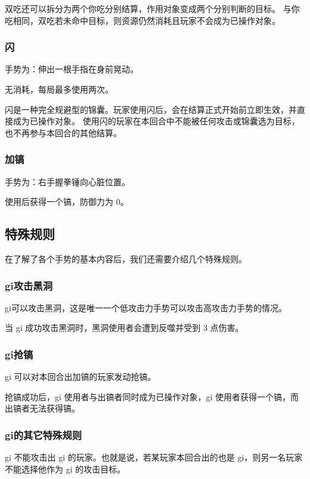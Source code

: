 \documentclass[12pt]{ctexart}
\begin{document}
双吃还可以拆分为两个你吃分别结算，作用对象变成两个分别判断的目标。
与你吃相同，双吃若未命中目标，则资源仍然消耗且玩家不会成为已操作对象。

\subsubsection{闪}

手势为：伸出一根手指在身前晃动。

无消耗，每局最多使用两次。

闪是一种完全规避型的锦囊。玩家使用闪后，会在结算正式开始前立即生效，并直接成为已操作对象。
使用闪的玩家在本回合中不能被任何攻击或锦囊选为目标，也不再参与本回合的其他结算。

\subsubsection{加镐}

手势为：右手握拳锤向心脏位置。

使用后获得一个镐，防御力为 0。

\subsection{特殊规则}

在了解了各个手势的基本内容后，我们还需要介绍几个特殊规则。

\subsubsection{gi攻击黑洞}

gi可以攻击黑洞，这是唯一一个低攻击力手势可以攻击高攻击力手势的情况。

当 gi 成功攻击黑洞时，黑洞使用者会遭到反噬并受到 3 点伤害。

\subsubsection{gi抢镐}

gi 可以对本回合出加镐的玩家发动抢镐。

抢镐成功后，gi 使用者与出镐者同时成为已操作对象，gi 使用者获得一个镐，而出镐者无法获得镐。

\subsubsection{gi的其它特殊规则}

gi 不能攻击出 gi 的玩家。也就是说，若某玩家本回合出的也是 gi，则另一名玩家不能选择他作为 gi 的攻击目标。
\end{document}
